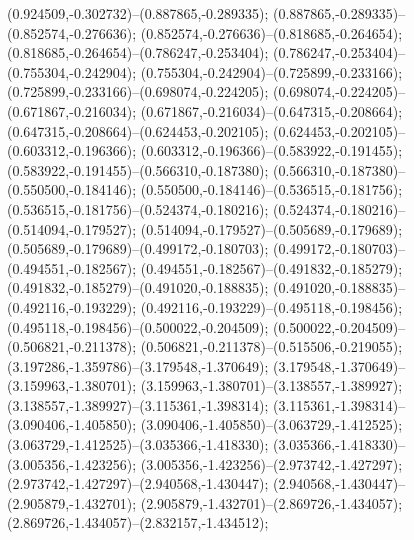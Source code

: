  (0.924509,-0.302732)--(0.887865,-0.289335);
 (0.887865,-0.289335)--(0.852574,-0.276636);
 (0.852574,-0.276636)--(0.818685,-0.264654);
 (0.818685,-0.264654)--(0.786247,-0.253404);
 (0.786247,-0.253404)--(0.755304,-0.242904);
 (0.755304,-0.242904)--(0.725899,-0.233166);
 (0.725899,-0.233166)--(0.698074,-0.224205);
 (0.698074,-0.224205)--(0.671867,-0.216034);
 (0.671867,-0.216034)--(0.647315,-0.208664);
 (0.647315,-0.208664)--(0.624453,-0.202105);
 (0.624453,-0.202105)--(0.603312,-0.196366);
 (0.603312,-0.196366)--(0.583922,-0.191455);
 (0.583922,-0.191455)--(0.566310,-0.187380);
 (0.566310,-0.187380)--(0.550500,-0.184146);
 (0.550500,-0.184146)--(0.536515,-0.181756);
 (0.536515,-0.181756)--(0.524374,-0.180216);
 (0.524374,-0.180216)--(0.514094,-0.179527);
 (0.514094,-0.179527)--(0.505689,-0.179689);
 (0.505689,-0.179689)--(0.499172,-0.180703);
 (0.499172,-0.180703)--(0.494551,-0.182567);
 (0.494551,-0.182567)--(0.491832,-0.185279);
 (0.491832,-0.185279)--(0.491020,-0.188835);
 (0.491020,-0.188835)--(0.492116,-0.193229);
 (0.492116,-0.193229)--(0.495118,-0.198456);
 (0.495118,-0.198456)--(0.500022,-0.204509);
 (0.500022,-0.204509)--(0.506821,-0.211378);
 (0.506821,-0.211378)--(0.515506,-0.219055);
 (3.197286,-1.359786)--(3.179548,-1.370649);
 (3.179548,-1.370649)--(3.159963,-1.380701);
 (3.159963,-1.380701)--(3.138557,-1.389927);
 (3.138557,-1.389927)--(3.115361,-1.398314);
 (3.115361,-1.398314)--(3.090406,-1.405850);
 (3.090406,-1.405850)--(3.063729,-1.412525);
 (3.063729,-1.412525)--(3.035366,-1.418330);
 (3.035366,-1.418330)--(3.005356,-1.423256);
 (3.005356,-1.423256)--(2.973742,-1.427297);
 (2.973742,-1.427297)--(2.940568,-1.430447);
 (2.940568,-1.430447)--(2.905879,-1.432701);
 (2.905879,-1.432701)--(2.869726,-1.434057);
 (2.869726,-1.434057)--(2.832157,-1.434512);
